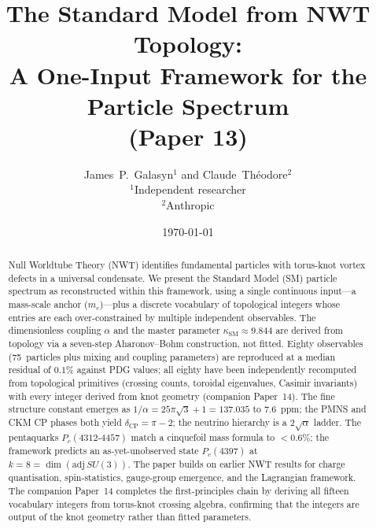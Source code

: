 \documentclass[11pt]{article}
\newcommand{\ksm}{\kappa_\text{SM}}
\newcommand{\dcp}{\delta_\text{CP}}
\begin{document}
\title{The Standard Model from NWT Topology:\\[4pt]
A One-Input Framework for the Particle Spectrum\\[2pt]
\normalsize (Paper 13)}

\author{
  James~P.~Galasyn$^{1}$ \quad and \quad Claude~Th\'eodore$^{2}$\\[2pt]
  \small $^1$Independent researcher \\
  \small $^2$Anthropic
}

\date{\today}

\maketitle

\begin{abstract}
Null Worldtube Theory (NWT) identifies fundamental particles with
torus-knot vortex defects in a universal condensate.  We present
the Standard Model (SM) particle spectrum as reconstructed within
this framework, using a single continuous input---a mass-scale
anchor ($m_e$)---plus a discrete vocabulary of topological integers
whose entries are each over-constrained by multiple independent
observables.  The
dimensionless coupling $\alpha$ and the master parameter
$\ksm \approx 9.844$ are derived from topology via a seven-step
Aharonov--Bohm construction, not fitted.  Eighty observables
(75~particles plus mixing and coupling parameters) are reproduced
at a median residual of $0.1\%$ against PDG values;
all eighty have been independently recomputed from topological
primitives (crossing counts, toroidal eigenvalues, Casimir
invariants) with every integer derived from knot geometry
(companion Paper~14).
The fine structure constant emerges as
$1/\alpha = 25\pi\sqrt{3} + 1 = 137.035$ to $7.6$~ppm; the PMNS
and CKM CP phases both yield $\dcp = \pi - 2$; the neutrino
hierarchy is a $2\sqrt{\alpha}$ ladder.  The pentaquarks
$P_c(4312\text{-}4457)$ match a cinquefoil mass formula to
$<0.6\%$; the framework predicts an as-yet-unobserved state
$P_c(4397)$ at $k = 8 = \dim(\mathrm{adj}\,SU(3))$.  The paper
builds on earlier NWT results for charge quantisation,
spin-statistics, gauge-group emergence, and the Lagrangian
framework.  The companion Paper~14 completes the first-principles
chain by deriving all fifteen vocabulary integers from torus-knot
crossing algebra, confirming that the integers are output of the
knot geometry rather than fitted parameters.
\end{abstract}
\end{document}
